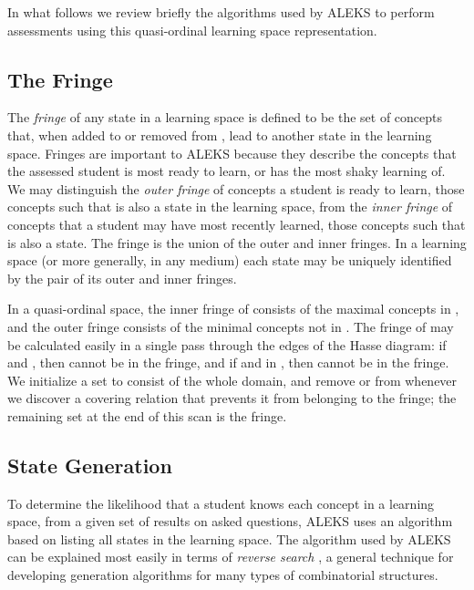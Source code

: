 \documentclass[11pt]{llncs}
\begin{document}
{In what follows we review briefly the algorithms used by ALEKS to perform assessments using this quasi-ordinal learning space representation.

\subsection{The Fringe}

The \emph{fringe} of any state  in a learning space is defined to be the set of concepts that, when added to or removed from , lead to another state in the learning space. Fringes are important to ALEKS because they describe the concepts that the assessed student is most ready to learn, or has the most shaky learning of. We may distinguish the \emph{outer fringe} of concepts a student is ready to learn, those concepts  such that  is also a state in the learning space, from the \emph{inner fringe} of concepts that a student may have most recently learned, those concepts  such that  is also a state. The fringe is the union of the outer and inner fringes. In a learning space (or more generally, in any medium) each state may be uniquely identified by the pair of its outer and inner fringes.

In a quasi-ordinal space, the inner fringe of  consists of the maximal concepts in , and the outer fringe consists of the minimal concepts not in . The fringe of  may be calculated easily in a single pass through the edges  of the Hasse diagram: if  and , then  cannot be in the fringe, and if  and  in , then  cannot be in the fringe.  We initialize a set  to consist of the whole domain, and remove  or  from  whenever we discover a covering relation that prevents it from belonging to the fringe; the remaining set at the end of this scan is the fringe.

\subsection{State Generation}

To determine the likelihood that a student knows each concept in a learning space, from a given set of results on asked questions, ALEKS uses an algorithm based on listing all states in the learning space. The algorithm used by ALEKS can be explained most easily in terms of \emph{reverse search} \citep{avis96}, a general technique for developing generation algorithms for many types of combinatorial structures.

}
\end{document}
